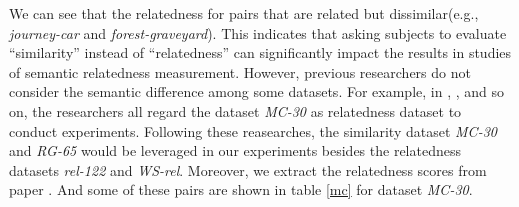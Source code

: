 \begin{table}[]
    \centering
    \caption{Relatedness vs MC-30 similarity}
    \label{mc}
    \renewcommand\arraystretch{1.2}
\end{table}
We can see that the relatedness for pairs that are related but
dissimilar(e.g., \emph{journey-car} and \emph{forest-graveyard}). 
This indicates that asking subjects to evaluate “similarity” instead of “relatedness” can
significantly impact the results in studies of semantic relatedness measurement.
However, previous researchers do not consider the semantic difference among some datasets.
For example, in \cite{ijcai/GabrilovichM07}, \cite{textgraphs/YehRMAS09}, \cite{aaai/Pirro12}
and so on, the researchers all regard the dataset \emph{MC-30} as relatedness dataset to conduct experiments.
Following these reasearches, the similarity dataset \emph{MC-30} and \emph{RG-65} would be leveraged in our experiments 
besides the relatedness datasets \emph{rel-122} and \emph{WS-rel}. Moreover, we extract the relatedness
scores from paper \cite{acl/SzumlanskiGS13}. And some of these pairs are shown in table \ref{mc} for dataset \emph{MC-30}.

